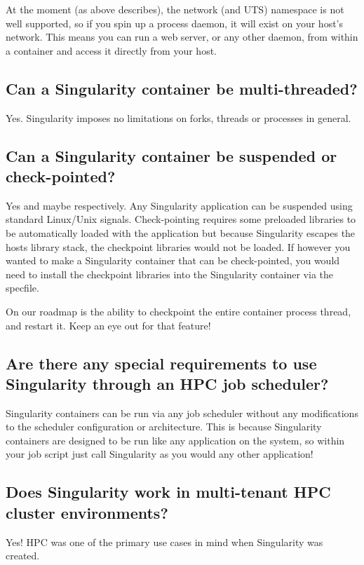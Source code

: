 \documentclass[letterpaper,10pt,english]{sphinxmanual}
\begin{document}
At the moment (as above describes), the network (and UTS) namespace is not well supported, so if you spin up a process daemon, it will exist on
your host’s network. This means you can run a web server, or any other daemon, from within a container and access it directly from your host.


\subsection{Can a Singularity container be multi-threaded?}
\label{\detokenize{faq:can-a-singularity-container-be-multi-threaded}}
Yes. Singularity imposes no limitations on forks, threads or processes in general.


\subsection{Can a Singularity container be suspended or check-pointed?}
\label{\detokenize{faq:can-a-singularity-container-be-suspended-or-check-pointed}}
Yes and maybe respectively. Any Singularity application can be suspended using standard Linux/Unix signals. Check-pointing requires some preloaded
libraries to be automatically loaded with the application but because Singularity escapes the hosts library stack, the checkpoint libraries would not
be loaded. If however you wanted to make a Singularity container that can be check-pointed, you would need to install the checkpoint libraries into the Singularity container via the specfile.

On our roadmap is the ability to checkpoint the entire container process thread, and restart it. Keep an eye out for that feature!


\subsection{Are there any special requirements to use Singularity through an HPC job scheduler?}
\label{\detokenize{faq:are-there-any-special-requirements-to-use-singularity-through-an-hpc-job-scheduler}}
Singularity containers can be run via any job scheduler without any modifications to the scheduler configuration or architecture.
This is because Singularity containers are designed to be run like any application on the system, so within your job script just call Singularity as you would any other application!


\subsection{Does Singularity work in multi-tenant HPC cluster environments?}
\label{\detokenize{faq:does-singularity-work-in-multi-tenant-hpc-cluster-environments}}
Yes! HPC was one of the primary use cases in mind when Singularity was created.
\end{document}
